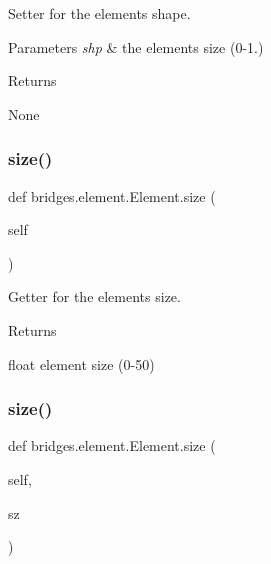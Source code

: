 Setter for the element\textquotesingle{}s shape. 


\begin{DoxyParams}{Parameters}
{\em shp} & the element\textquotesingle{}s size (0-\/1.) \\
\hline
\end{DoxyParams}
\begin{DoxyReturn}{Returns}


None 
\end{DoxyReturn}
\mbox{\label{classbridges_1_1element_1_1_element_a4d25b09a11a282c8c8147b16cd45c5bf}} 
\subsubsection{\texorpdfstring{size()}{size()}\hspace{0.1cm}{\footnotesize\ttfamily [1/2]}}
{\footnotesize\ttfamily def bridges.\+element.\+Element.\+size (\begin{DoxyParamCaption}\item[{}]{self }\end{DoxyParamCaption})}



Getter for the element\textquotesingle{}s size. 

\begin{DoxyReturn}{Returns}


float element size (0-\/50) 
\end{DoxyReturn}
\mbox{\label{classbridges_1_1element_1_1_element_afbb37ab4474c2ac1b7da950fb06819ed}} 
\subsubsection{\texorpdfstring{size()}{size()}\hspace{0.1cm}{\footnotesize\ttfamily [2/2]}}
{\footnotesize\ttfamily def bridges.\+element.\+Element.\+size (\begin{DoxyParamCaption}\item[{}]{self,  }\item[{}]{sz }\end{DoxyParamCaption})}



